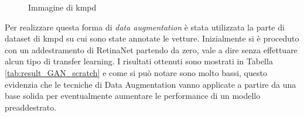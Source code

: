 \begin{figure}[]
\begin{minipage}{.29\linewidth}
{            }
    \end{minipage}
    \begin{minipage}{.29\linewidth}
        \centering
    \end{minipage}
    \centering
    \caption{Immagine di \ac{kmpd}}
    \label{fig:gan}
\end{figure}

Per realizzare questa forma di \textit{data augmentation} è stata utilizzata la parte di dataset di \ac{kmpd} su cui sono state annotate le vetture. Inizialmente si è proceduto con un addestramento di RetinaNet partendo da zero, vale a dire senza effettuare alcun tipo di transfer learning. 
I risultati ottenuti sono mostrati in Tabella \ref{tab:result_GAN_scratch} e come si può notare sono molto bassi, questo evidenzia che le tecniche di Data Augmentation vanno applicate a partire da una base solida per eventualmente aumentare le performance di un modello preaddestrato.

\begin{table}[]
    \caption{Risultati del test di RetinaNet sul dataset di \ac{kmpd} dopo una fase di addestramento su dati generati da \ac{GAN}. Nella colonna \textit{NOGAN} sono presenti i risultati ottenuti addestrando solamente sulla parte di \ac{kmpd} visibile e testando sul termico reale.}
    \label{tab:result_GAN_scratch}
\end{table}


